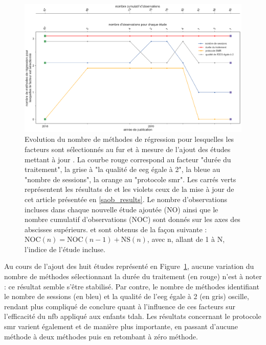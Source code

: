 \begin{figure}[h!]
  \centering
	\includegraphics[width=1\linewidth]{figures/chapter-3/factors-evolution-with-update} 
  \caption{Evolution du nombre de méthodes de régression pour lesquelles les facteurs sont sélectionnés au fur et à mesure de l'ajout des études mettant à jour \citet{Bussalb2019clinical}.
	La courbe rouge correspond au facteur "durée du traitement", la grise à "la qualité de \gls{eeg} égale à 2", la bleue au "nombre de sessions", la orange au "protocole \gls{smr}". 
	Les carrés verts représentent les résultats de \citet{Bussalb2019clinical} et les violets ceux de la mise à jour de cet article présentée en \ref{saob_results}.
	Le nombre d'observations incluses dans chaque nouvelle étude ajoutée (NO) ainsi que le nombre cumulatif d'observations (NOC) sont donnés sur les axes des abscisses supérieurs.
	et sont obtenus de la façon suivante : $\text{NOC}(n) = \text{NOC}(n - 1) + \text{NS}(n)$, avec n, allant de 1 à N, l'indice de l'étude incluse.}
  \label{Figure:factors_evolution_with_update}
\end{figure}

Au cours de l'ajout des huit études représenté en Figure~\ref{Figure:factors_evolution_with_update}, aucune variation du nombre de méthodes sélectionnant la durée du traitement (en rouge) 
n'est à noter :
ce résultat semble s'être stabilisé. Par contre, le nombre de méthodes identifiant le nombre de sessions (en bleu) et la qualité de l'\gls{eeg} égale à 2 (en gris) oscille, rendant plus 
compliqué de conclure quant à l'influence de ces facteurs sur l'efficacité du \gls{nfb} appliqué aux enfants \gls{tdah}. Les résultats concernant le protocole \gls{smr} varient
également et de manière plus importante, en passant d'aucune méthode à deux méthodes puis en retombant à zéro méthode.

